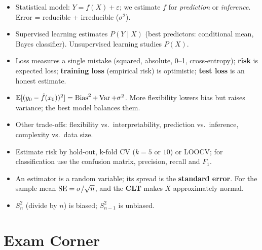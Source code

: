 \begin{summary}
\begin{itemize}
  \item Statistical model: $Y=f(X)+\varepsilon$; we estimate $f$ for \emph{prediction} or \emph{inference}. Error = reducible + irreducible ($\sigma^2$).
  \item Supervised learning estimates $P(Y\mid X)$ (best predictors: conditional mean, Bayes classifier). Unsupervised learning studies $P(X)$.
  \item Loss measures a single mistake (squared, absolute, 0--1, cross-entropy); \textbf{risk} is expected loss; \textbf{training loss} (empirical risk) is optimistic; \textbf{test loss} is an honest estimate.
  \item $\mathbb{E}[(y_0-\hat f(x_0))^2]=\operatorname{Bias}^2+\operatorname{Var}+\sigma^2$. More flexibility lowers bias but raises variance; the best model balances them.
  \item Other trade-offs: flexibility vs.\ interpretability, prediction vs.\ inference, complexity vs.\ data size.
  \item Estimate risk by hold-out, k-fold CV ($k=5$ or $10$) or LOOCV; for classification use the confusion matrix, precision, recall and $F_1$.
  \item An estimator is a random variable; its spread is the \textbf{standard error}. For the sample mean $\operatorname{SE}=\sigma/\sqrt n$, and the \textbf{CLT} makes $\bar X$ approximately normal.
  \item $S_n^2$ (divide by $n$) is biased; $S_{n-1}^2$ is unbiased.
\end{itemize}
\end{summary}

\section*{Exam Corner}

